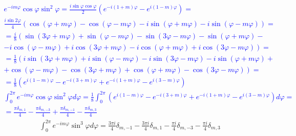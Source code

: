 %
\textcolor{blue}{ \begin{equation*} \begin{aligned}
e^{-i m \varphi} \cos \varphi \sin^2 \varphi = 
\frac{i \sin \varphi \cos \varphi}{2} 
\left( e^{-i(1+m)\varphi} - e^{i(1-m)\varphi} \right) = \\
\frac{i \sin 2 \varphi}{4} \left( \cos (\varphi + m \varphi) - 
\cos (\varphi - m \varphi) - i \sin (\varphi + m \varphi) - 
i \sin (\varphi - m \varphi) \right) = \\
= \frac{i}{8} \left( \sin (3 \varphi + m \varphi) + 
\sin (\varphi - m \varphi) - \sin (3 \varphi - m \varphi) - 
\sin (\varphi + m \varphi) - \right. \\ 
- \left. i \cos (\varphi - m \varphi) + i \cos (3 \varphi + m \varphi)  -
i \cos (\varphi + m \varphi) + i \cos (3 \varphi - m \varphi) \right) = \\
= \frac{1}{8} \left( i \sin (3 \varphi + m \varphi) + 
i \sin (\varphi - m \varphi) - i \sin (3 \varphi - m \varphi) - 
i \sin (\varphi + m \varphi) + \right. \\ 
+ \left.  \cos (\varphi - m \varphi) - \cos (3 \varphi + m \varphi)  +
\cos (\varphi + m \varphi) - \cos (3 \varphi - m \varphi) \right) = \\
= \frac{1}{8} \left( e^{i (1-m) \varphi} - e^{-i (3+m) \varphi} + 
e^{-i (1+m) \varphi} - e^{i (3-m) \varphi} \right)
\end{aligned} \end{equation*} }
%
\textcolor{blue}{ \begin{equation*} \begin{aligned}
\int_{0}^{2\pi} e^{-i m \varphi} \cos \varphi \sin^2 \varphi d \varphi = 
\frac{1}{8} \int_{0}^{2\pi} \left( e^{i (1-m) \varphi} - e^{-i (3+m) \varphi} + 
e^{-i (1+m) \varphi} - e^{i (3-m) \varphi} \right) d \varphi = \\
= \frac{\pi \delta_{m,1} }{4}  - \frac{\pi \delta_{m,-3} }{4} + 
\frac{\pi \delta_{m,-1} }{4}  - \frac{\pi \delta_{m,3} }{4}  
\end{aligned} \end{equation*} }
%
\begin{equation} \begin{aligned} \label{eq:int_exp4}
\int_{0}^{2\pi} e^{-i m \varphi} \sin^3 \varphi d \varphi = 
\frac{3 \pi i}{4} \delta_{m,-1} - \frac{3 \pi i}{4} \delta_{m,1} - 
\frac{\pi i}{4} \delta_{m,-3} - \frac{\pi i}{4} \delta_{m,3}
\end{aligned} \end{equation}
%
